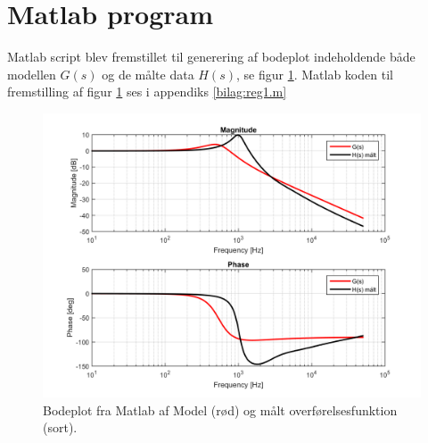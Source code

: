 \section{Matlab program}\label{sec:spm3}
Matlab script blev fremstillet til generering af bodeplot indeholdende både modellen $G(s)$ og de målte data $H(s)$, se figur \ref{fig:bodeplot}.
Matlab koden til fremstilling af figur \ref{fig:bodeplot} ses i appendiks \ref{bilag:reg1.m}
\begin{figure}[h!]
	\centering
	\includegraphics[width=.8\textwidth]{reg1/bodeplot.png}
	\caption{Bodeplot fra Matlab af Model (rød) og målt overførelsesfunktion (sort).}
	\label{fig:bodeplot}
\end{figure}
\FloatBlock

